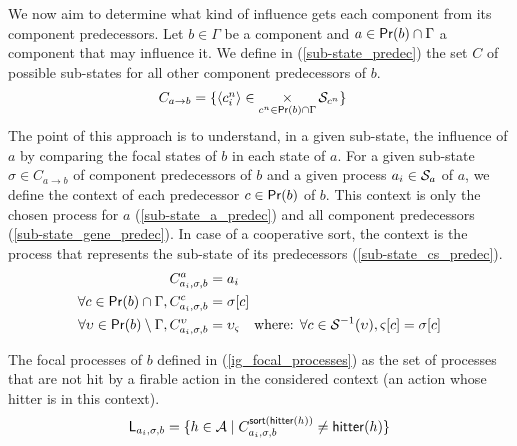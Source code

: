 We now aim to determine what kind of influence gets each component from its component predecessors. %
Let $b \in \Gamma$ be a component and $a \in \mathsf{Pr}(b) \cap \Gamma$ a component that may influence it. We define in (\ref{sub-state_predec}) the set $C$ of possible sub-states for all other component predecessors of $b$.
\begin{align}
\label{sub-state_predec}
  C_{a \rightarrow b} &= \{\mbox{$\langle c^n_i \rangle$} \in \mathop{\times}_{c^n \in \mathsf{Pr}(b) \cap \Gamma} \mathcal{S}_{c^n}\}
\end{align}
The point of this approach is to understand, in a given sub-state, the influence of $a$ by comparing the focal states of $b$ in each state of $a$. For a given sub-state $\sigma \in C_{a \rightarrow b}$ of component predecessors of $b$ and a given process $a_i \in \mathcal{S}_a$ of $a$, we define the context of each predecessor $c \in \mathsf{Pr}(b)$ of $b$. This context is only the chosen process for $a$ (\ref{sub-state_a_predec}) and all component predecessors (\ref{sub-state_gene_predec}). In case of a cooperative sort, the context is the process that represents the sub-state of its predecessors (\ref{sub-state_cs_predec}).
\begin{align}
\label{sub-state_a_predec}
  C^{a}_{a_i,\sigma,b} &= a_i \\
\label{sub-state_gene_predec}
  \forall c \in \mathsf{Pr}(b) \cap \Gamma, C^{c}_{a_i,\sigma,b} &= {\sigma[c]} \\
\label{sub-state_cs_predec}
  \forall \upsilon \in \mathsf{Pr}(b) \setminus \Gamma, C^{\upsilon}_{a_i,\sigma,b} &= \upsilon_\varsigma \quad \text{where: } \forall c \in \mathcal{S}^{-1}(\upsilon), {\varsigma[c]} = {\sigma[c]}
\end{align}


The focal processes of $b$ defined in (\ref{ig_focal_processes}) as the set of processes that are not hit by a firable action in the considered context (\ie an action whose hitter is in this context).
\begin{align}
\label{ig_focal_processes}
  \mathsf{L}_{a_i,\sigma,b} &= \{h \in \mathcal{A} \mid C^{\mathsf{sort}(\mathsf{hitter}(h))}_{a_i,\sigma,b} \neq \mathsf{hitter}(h)\} \\
\end{align}


